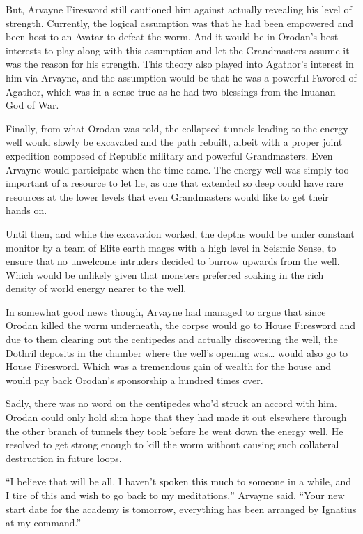 \documentclass[a4paper,10pt]{book}
\begin{document}
But, Arvayne Firesword still cautioned him against actually revealing his level of strength. Currently, the logical assumption was that he had been empowered and been host to an Avatar to defeat the worm. And it would be in Orodan’s best interests to play along with this assumption and let the Grandmasters assume it was the reason for his strength. This theory also played into Agathor’s interest in him via Arvayne, and the assumption would be that he was a powerful Favored of Agathor, which was in a sense true as he had two blessings from the Inuanan God of War.\par
Finally, from what Orodan was told, the collapsed tunnels leading to the energy well would slowly be excavated and the path rebuilt, albeit with a proper joint expedition composed of Republic military and powerful Grandmasters. Even Arvayne would participate when the time came. The energy well was simply too important of a resource to let lie, as one that extended so deep could have rare resources at the lower levels that even Grandmasters would like to get their hands on.\par
Until then, and while the excavation worked, the depths would be under constant monitor by a team of Elite earth mages with a high level in Seismic Sense, to ensure that no unwelcome intruders decided to burrow upwards from the well. Which would be unlikely given that monsters preferred soaking in the rich density of world energy nearer to the well.\par
In somewhat good news though, Arvayne had managed to argue that since Orodan killed the worm underneath, the corpse would go to House Firesword and due to them clearing out the centipedes and actually discovering the well, the Dothril deposits in the chamber where the well’s opening was… would also go to House Firesword. Which was a tremendous gain of wealth for the house and would pay back Orodan’s sponsorship a hundred times over.\par
Sadly, there was no word on the centipedes who’d struck an accord with him. Orodan could only hold slim hope that they had made it out elsewhere through the other branch of tunnels they took before he went down the energy well. He resolved to get strong enough to kill the worm without causing such collateral destruction in future loops.\par
“I believe that will be all. I haven’t spoken this much to someone in a while, and I tire of this and wish to go back to my meditations,” Arvayne said. “Your new start date for the academy is tomorrow, everything has been arranged by Ignatius at my command.”\par
\end{document}
